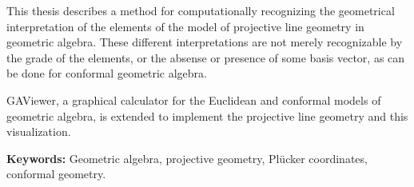 This thesis describes a method for computationally recognizing the geometrical interpretation of the elements of the model of projective line geometry in geometric algebra.  These different interpretations are not merely recognizable by the grade of the elements, or the absense or presence of some basis vector, as can be done for conformal geometric algebra.

GAViewer, a graphical calculator for the Euclidean and conformal models of geometric algebra, is extended to implement the projective line geometry and this visualization.

\textbf{Keywords:} Geometric algebra, projective geometry, Pl\"ucker coordinates, conformal geometry.
